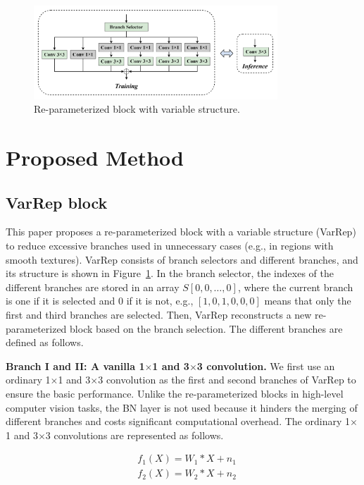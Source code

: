 \documentclass[sn-mathphys]{sn-jnl}%
\theoremstyle{thmstyleone}%
\theoremstyle{thmstyletwo}%
\theoremstyle{thmstylethree}%
\begin{document}
\begin{figure}[h!]
    \centering
    \includegraphics[width=3.6in]{VarRep2.png}
    \caption{Re-parameterized block with variable structure.}
    \label{VarRep}
\end{figure} 

\section{Proposed Method}
\subsection{VarRep block}
This paper proposes a re-parameterized block with a variable structure (VarRep) to reduce excessive branches used in unnecessary cases (e.g., in regions with smooth textures). VarRep consists of branch selectors and different branches, and its structure is shown in Figure~\ref{VarRep}. In the branch selector, the indexes of the different branches are stored in an array $S[0,0, \ldots, 0]$, where the current branch is one if it is selected and 0 if it is not, e.g., $[1,0,1,0,0,0]$ means that only the first and third branches are selected. Then, VarRep reconstructs a new re-parameterized block based on the branch selection. The different branches are defined as follows.

\textbf{Branch I and II: A vanilla 1$\times$1 and 3$\times$3 convolution.} We first use an ordinary 1$\times$1 and 3$\times$3 convolution as the first and second branches of VarRep to ensure the basic performance. Unlike the re-parameterized blocks in high-level computer vision tasks, the BN layer \cite{BN} is not used because it hinders the merging of different branches and costs significant computational overhead. The ordinary 1$\times$1 and 3$\times$3 convolutions are represented as follows.

\begin{equation}
\begin{aligned}
&f_1(X)=W_1 * X+n_1 \\
&f_2(X)=W_2 * X+n_2
\end{aligned}
\end{equation}
\end{document}
